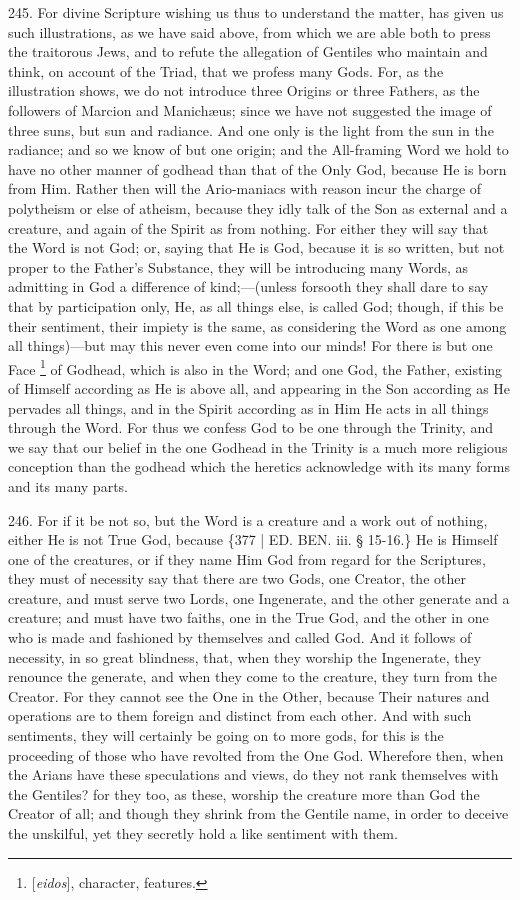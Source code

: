 245. For
divine Scripture wishing us thus to understand the matter, has given
us such illustrations, as we have said above, from which we are
able both to press the traitorous Jews, and to refute the allegation
of Gentiles who maintain and think, on account of the Triad, that we
profess many Gods. For, as the illustration shows, we do not introduce
three Origins or three Fathers, as the followers of Marcion and Manichæus;
since we have not suggested the image of three suns, but sun and
radiance. And one only is the light from the sun in the radiance; and
so we know of but one origin; and the All-framing Word we hold to have
no other manner of godhead than that of the Only God, because He is
born from Him. Rather then will the Ario-maniacs with reason incur the
charge of polytheism or else of atheism, because they idly talk of the
Son as external and a creature, and again of the Spirit as from
nothing. For either they will say that the Word is not God; or, saying
that He is God, because it is so written, but not proper to the Father's
Substance, they will be introducing many Words, as admitting in God a
difference of kind;—(unless forsooth they shall dare to say that by
participation only, He, as all things else, is called God; though, if
this be their sentiment, their impiety is the same, as considering the
Word as one among all things)—but may this never even come into our
minds! For there is but one Face \footnote{[\emph{eidos}], character, features.} of Godhead, which is also in the Word; and one God, the
Father, existing of Himself according as He is above all, and
appearing in the Son according as He pervades all things, and in the
Spirit according as in Him He acts in all things through the Word. For
thus we confess God to be one through the Trinity, and we say that our
belief in the one Godhead in the Trinity is a much more religious
conception than the godhead which the heretics acknowledge with its
many forms and its many parts.

246. For if
it be not so, but the Word is a creature and a work out of nothing,
either He is not True God, because \{377 | ED. BEN.
iii. § 15-16.\} He is Himself one of the creatures, or if they name
Him God from regard for the Scriptures, they must of necessity say
that there are two Gods, one Creator, the other creature, and must
serve two Lords, one Ingenerate, and the other generate and a
creature; and must have two faiths, one in the True God, and the other
in one who is made and fashioned by themselves and called God. And it
follows of necessity, in so great blindness, that, when they worship
the Ingenerate, they renounce the generate, and when they come to the
creature, they turn from the Creator. For they cannot see the One in
the Other, because Their natures and operations are to them foreign
and distinct from each other. And with such sentiments, they will
certainly be going on to more gods, for this is the proceeding of
those who have revolted from the One God. Wherefore then, when the
Arians have these speculations and views, do they not rank themselves
with the Gentiles? for they too, as these, worship the creature more
than God the Creator of all; and though they shrink from the Gentile
name, in order to deceive the unskilful, yet they secretly hold a like
sentiment with them.


